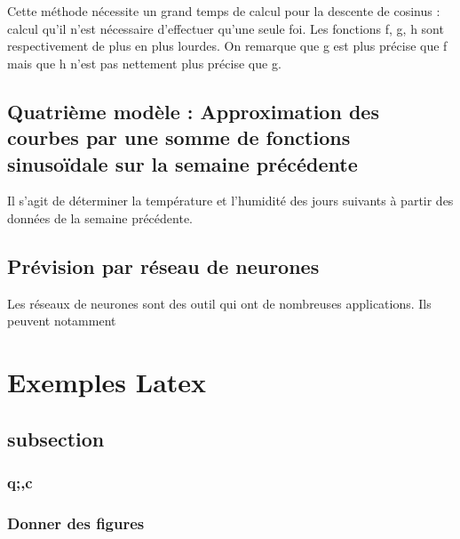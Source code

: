 \documentclass[11pt,a4paper]{article}
\begin{document}
Cette méthode nécessite un grand temps de calcul pour la descente de cosinus : calcul qu'il n'est nécessaire d'effectuer qu'une seule foi. Les fonctions f, g, h sont respectivement de plus en plus lourdes. On remarque que g est plus précise que f mais que h n'est pas nettement plus précise que g.



\subsection {Quatrième modèle : Approximation des courbes par une somme de fonctions sinusoïdale sur la semaine précédente }
Il s'agit de déterminer la température et l'humidité des jours suivants à partir des données de la semaine précédente.

\subsection {Prévision par réseau de neurones}
Les réseaux de neurones sont des outil qui ont de nombreuses applications. Ils peuvent notamment 



























\section{Exemples Latex}
\subsection{subsection}
\subsubsection{q;,c}
\subsubsection{Donner des figures}
\end{document}
